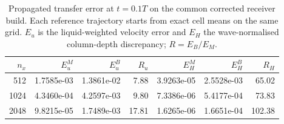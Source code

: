 \begin{table}[tbp]\centering\small
\caption{Propagated transfer error at $t=0.1T$ on the common corrected receiver build. Each reference trajectory starts from exact cell means on the same grid. $E_u$ is the liquid-weighted velocity error and $E_H$ the wave-normalised column-depth discrepancy; $R=E_B/E_M$.}\label{tab:audited-dynamics}
\begin{tabular}{@{}rrrrrrr@{}}\toprule
$n_x$ & $E_u^M$ & $E_u^B$ & $R_u$ & $E_H^M$ & $E_H^B$ & $R_H$\\\midrule
512 & 1.7585e-03 & 1.3861e-02 & 7.88 & 3.9263e-05 & 2.5528e-03 & 65.02\\
1024 & 4.3460e-04 & 4.2597e-03 & 9.80 & 7.3386e-06 & 5.4177e-04 & 73.83\\
2048 & 9.8215e-05 & 1.7489e-03 & 17.81 & 1.6265e-06 & 1.6651e-04 & 102.38\\
\bottomrule\end{tabular}
\end{table}
